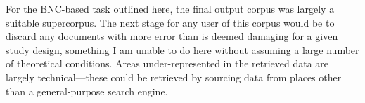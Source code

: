 For the BNC-based task outlined here, the final output corpus was largely a suitable supercorpus.  The next stage for any user of this corpus would be to discard any documents with more error than is deemed damaging for a given study design, something I am unable to do here without assuming a large number of theoretical conditions.  Areas under-represented in the retrieved data are largely technical---these could be retrieved by sourcing data from places other than a general-purpose search engine.  %






